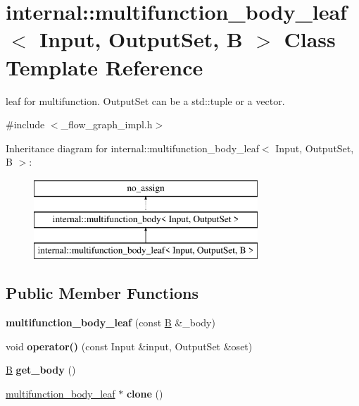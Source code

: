 \hypertarget{classinternal_1_1multifunction__body__leaf}{}\section{internal\+:\+:multifunction\+\_\+body\+\_\+leaf$<$ Input, Output\+Set, B $>$ Class Template Reference}
\label{classinternal_1_1multifunction__body__leaf}


leaf for multifunction. Output\+Set can be a std\+::tuple or a vector.  




{\ttfamily \#include $<$\+\_\+flow\+\_\+graph\+\_\+impl.\+h$>$}

Inheritance diagram for internal\+:\+:multifunction\+\_\+body\+\_\+leaf$<$ Input, Output\+Set, B $>$\+:\begin{figure}[H]
\begin{center}
\leavevmode
\includegraphics[height=3.000000cm]{classinternal_1_1multifunction__body__leaf}
\end{center}
\end{figure}
\subsection*{Public Member Functions}
\begin{DoxyCompactItemize}
\item 
\hypertarget{classinternal_1_1multifunction__body__leaf_ae3db099ec10d330d80a0e49781a0eaca}{}{\bfseries multifunction\+\_\+body\+\_\+leaf} (const \hyperlink{classB}{B} \&\+\_\+body)\label{classinternal_1_1multifunction__body__leaf_ae3db099ec10d330d80a0e49781a0eaca}

\item 
\hypertarget{classinternal_1_1multifunction__body__leaf_ad91d99ba5036c5e09d8ad1b763f6bb84}{}void {\bfseries operator()} (const Input \&input, Output\+Set \&oset)\label{classinternal_1_1multifunction__body__leaf_ad91d99ba5036c5e09d8ad1b763f6bb84}

\item 
\hypertarget{classinternal_1_1multifunction__body__leaf_aa78d85db11a0193b6bb8631ba4a9a093}{}\hyperlink{classB}{B} {\bfseries get\+\_\+body} ()\label{classinternal_1_1multifunction__body__leaf_aa78d85db11a0193b6bb8631ba4a9a093}

\item 
\hypertarget{classinternal_1_1multifunction__body__leaf_a2e381d0a31e88fd9ccdafd864e517936}{}\hyperlink{classinternal_1_1multifunction__body__leaf}{multifunction\+\_\+body\+\_\+leaf} $\ast$ {\bfseries clone} ()\label{classinternal_1_1multifunction__body__leaf_a2e381d0a31e88fd9ccdafd864e517936}

\end{DoxyCompactItemize}


